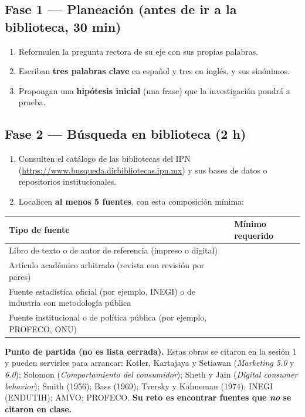 \documentclass[11pt,letterpaper]{article}
\begin{document}
\subsection*{Fase 1 --- Planeación (antes de ir a la biblioteca, 30 min)}
\begin{enumerate}[leftmargin=1.4em, itemsep=3pt]
  \item Reformulen la pregunta rectora de su eje con sus propias palabras.
  \item Escriban \textbf{tres palabras clave} en español y tres en inglés, y sus sinónimos.
  \item Propongan una \textbf{hipótesis inicial} (una frase) que la investigación pondrá a prueba.
\end{enumerate}

\subsection*{Fase 2 --- Búsqueda en biblioteca (2 h)}
\begin{enumerate}[leftmargin=1.4em, itemsep=3pt]
  \item Consulten el catálogo de las bibliotecas del IPN (\url{https://www.busqueda.dirbibliotecas.ipn.mx}) y sus bases de datos o repositorios institucionales.
  \item Localicen \textbf{al menos 5 fuentes}, con esta composición mínima:
\end{enumerate}

\begin{center}
\small
\begin{tabular}{@{}>{\raggedright}p{6.2cm}>{\raggedright\arraybackslash}p{7.6cm}@{}}
\toprule
\textbf{Tipo de fuente} & \textbf{Mínimo requerido} \\
\midrule
Libro de texto o de autor de referencia (impreso o digital) & 1 \\
Artículo académico arbitrado (revista con revisión por pares) & 2 \\
Fuente estadística oficial (por ejemplo, INEGI) o de industria con metodología pública & 1 \\
Fuente institucional o de política pública (por ejemplo, PROFECO, ONU) & 1 \\
\bottomrule
\end{tabular}
\end{center}

\begin{caja}
\textbf{Punto de partida (no es lista cerrada).} Estas obras se citaron en la
sesión 1 y pueden servirles para arrancar: Kotler, Kartajaya y Setiawan
(\textit{Marketing 5.0} y \textit{6.0}); Solomon (\textit{Comportamiento del
consumidor}); Sheth y Jain (\textit{Digital consumer behavior}); Smith (1956);
Bass (1969); Tversky y Kahneman (1974); INEGI (ENDUTIH); AMVO; PROFECO.
\textbf{Su reto es encontrar fuentes que \emph{no} se citaron en clase.}
\end{caja}
\end{document}
